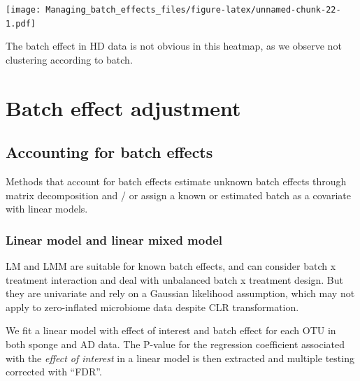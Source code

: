 \documentclass[]{book}
\begin{document}
\texttt{[image: Managing\_batch\_effects\_files/figure-latex/unnamed-chunk-22-1.pdf]}

The batch effect in HD data is not obvious in this heatmap, as we
observe not clustering according to batch.

\chapter{Batch effect adjustment}\label{adjust}

\section{Accounting for batch
effects}\label{accounting-for-batch-effects}

Methods that account for batch effects estimate unknown batch effects
through matrix decomposition and / or assign a known or estimated batch
as a covariate with linear models.

\subsection{Linear model and linear mixed
model}\label{linear-model-and-linear-mixed-model}

LM and LMM are suitable for known batch effects, and can consider batch
x treatment interaction and deal with unbalanced batch x treatment
design. But they are univariate and rely on a Gaussian likelihood
assumption, which may not apply to zero-inflated microbiome data despite
CLR transformation.

We fit a linear model with effect of interest and batch effect for each
OTU in both sponge and AD data. The P-value for the regression
coefficient associated with the \emph{effect of interest} in a linear
model is then extracted and multiple testing corrected with ``FDR''.
\end{document}
